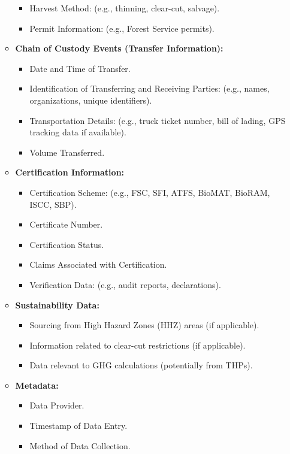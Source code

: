 \documentclass[a4paper, 11pt]{article}
\begin{document}
\begin{itemize}
\begin{itemize}
\begin{itemize}
                    \item Harvest Method: (e.g., thinning, clear-cut, salvage).
                    \item Permit Information: (e.g., Forest Service permits).
                \end{itemize}
            \item \textbf{Chain of Custody Events (Transfer Information):}
                \begin{itemize} %
                    \item Date and Time of Transfer.
                    \item Identification of Transferring and Receiving Parties: (e.g., names, organizations, unique identifiers).
                    \item Transportation Details: (e.g., truck ticket number, bill of lading, GPS tracking data if available).
                    \item Volume Transferred.
                \end{itemize}
            \item \textbf{Certification Information:}
                \begin{itemize} %
                    \item Certification Scheme: (e.g., FSC, SFI, ATFS, BioMAT, BioRAM, ISCC, SBP).
                    \item Certificate Number.
                    \item Certification Status.
                    \item Claims Associated with Certification.
                    \item Verification Data: (e.g., audit reports, declarations).
                \end{itemize}
            \item \textbf{Sustainability Data:}
                \begin{itemize} %
                    \item Sourcing from High Hazard Zones (HHZ) areas (if applicable).
                    \item Information related to clear-cut restrictions (if applicable).
                    \item Data relevant to GHG calculations (potentially from THPs).
                \end{itemize}
            \item \textbf{Metadata:}
                \begin{itemize} %
                    \item Data Provider.
                    \item Timestamp of Data Entry.
                    \item Method of Data Collection.
                \end{itemize}
        \end{itemize} %


\end{itemize}
\end{document}
